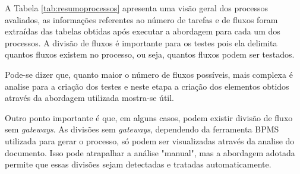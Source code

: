 \documentclass[12pt]{article}
\begin{document}
A Tabela \ref{tab:resumoprocessos} apresenta uma visão geral dos processos avaliados, as informações referentes ao número de tarefas e de fluxos foram extraídas das tabelas obtidas após executar a abordagem para cada um dos processos. A divisão de fluxos é importante para os testes pois ela delimita quantos fluxos existem no processo, ou seja, quantos fluxos podem ser testados.
 
\begin{table}[]
\centering
\caption{Resumo dos processos avaliados}
\label{tab:resumoprocessos}
\end{table}


 Pode-se dizer que, quanto maior o número de fluxos possíveis, mais complexa é analise para a criação dos testes e neste etapa a criação dos elementos obtidos através da abordagem utilizada mostra-se útil.
 
 Outro ponto importante é que, em alguns casos, podem existir divisão de fluxo sem \emph{gateways}. As divisões sem \emph{gateways}, dependendo da ferramenta BPMS utilizada para gerar o processo, só podem ser visualizadas através da analise do documento. Isso pode atrapalhar a análise "manual", mas a abordagem adotada permite que essas divisões sejam detectadas e tratadas automaticamente.
\end{document}
